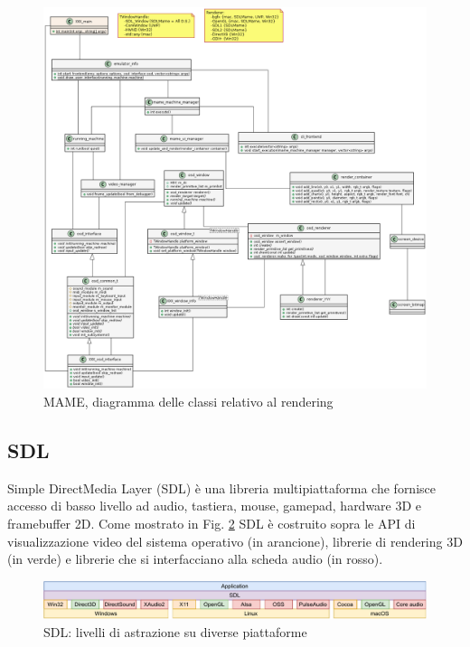 \begin{figure}[H]
	\includegraphics[width=\linewidth]{immagini/mame_video_class_diagram}
	\caption{MAME, diagramma delle classi relativo al rendering}
	\label{fig:mame_video_class_diagram}
\end{figure}

\subsection{SDL}
Simple DirectMedia Layer (SDL) è una libreria multipiattaforma che fornisce accesso di basso livello ad audio, tastiera, mouse, gamepad, hardware 3D e framebuffer 2D. Come mostrato in Fig. \ref{fig:sdl} SDL è costruito sopra le API di visualizzazione video del sistema operativo (in arancione), librerie di rendering 3D (in verde) e librerie che si interfacciano alla scheda audio (in rosso)\cite{SDL_Wiki}.

\begin{figure}[H]
	\includegraphics[width=\linewidth]{immagini/sdl}
	\caption{SDL: livelli di astrazione su diverse piattaforme}
	\label{fig:sdl}
\end{figure}

